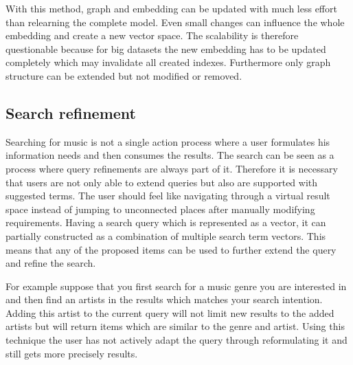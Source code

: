 \documentclass[sigconf]{acmart}
\begin{document}
With this method, graph and embedding can be updated with much less effort than relearning the complete model. Even small changes can influence the whole embedding and create a new vector space. The scalability is therefore questionable because for big datasets the new embedding has to be updated completely which may invalidate all created indexes. Furthermore only graph structure can be extended but not modified or removed.


\subsection{Search refinement}

Searching for music is not a single action process where a user formulates his information needs and then consumes the results. The search can be seen as a process where query refinements are always part of it. Therefore it is necessary that users are not only able to extend queries but also are supported with suggested terms. The user should feel like navigating through a virtual result space instead of jumping to unconnected places after manually modifying requirements. Having a search query which is represented as a vector, it can partially constructed as a combination of multiple search term vectors. This means that any of the proposed items can be used to further extend the query and refine the search.

For example suppose that you first search for a music genre you are interested in and then find an artists in the results which matches your search intention. Adding this artist to the current query will not limit new results to the added artists but will return items which are similar to the genre and artist. Using this technique the user has not actively adapt the query through reformulating it and still gets more precisely results. \\
\end{document}
